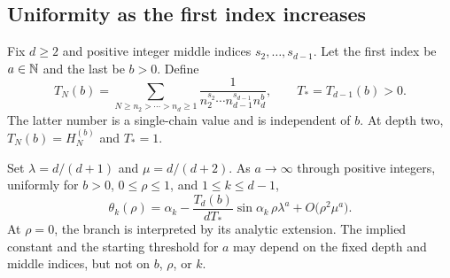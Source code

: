 \subsection{Uniformity as the first index increases}
Fix $d\ge2$ and positive integer middle indices
$s_2,\ldots,s_{d-1}$. Let the first index be $a\in\mathbb N$ and the
last be $b>0$. Define
\[
 T_N(b)=\sum_{N\ge n_2>\cdots>n_d\ge1}
       \frac1{n_2^{s_2}\cdots n_{d-1}^{s_{d-1}}n_d^b},
 \qquad T_*=T_{d-1}(b)>0.
\]
The latter number is a single-chain value and is independent of $b$.
At depth two, $T_N(b)=H_N^{(b)}$ and $T_*=1$.

\begin{theorem}
\label{ado:thm:largeouter}
Set $\lambda=d/(d+1)$ and $\mu=d/(d+2)$. As $a\to\infty$ through
positive integers, uniformly for $b>0$, $0\le\rho\le1$, and
$1\le k\le d-1$,
\begin{equation}\label{ado:eq:largeouter}
 \theta_k(\rho)
 =\alpha_k-\frac{T_d(b)}{dT_*}\sin\alpha_k\,
                      \rho\lambda^a
       +O\bigl(\rho^2\mu^a\bigr).
\end{equation}
At $\rho=0$, the branch is interpreted by its analytic extension.
The implied constant and the starting threshold for $a$ may depend on
the fixed depth and middle indices, but not on $b$, $\rho$, or $k$.
\end{theorem}
